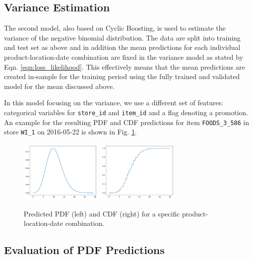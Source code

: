 \documentclass[BCOR=1mm, DIV=calc,10pt,
twoside=true,
twocolumn,
headings=normal]{scrartcl}
\newcommand{\fig}{Fig. }
\newcommand{\eqn}{Eqn. }
\begin{document}
\subsection{Variance Estimation}

The second model, also based on Cyclic Boosting, is used to estimate the variance of the negative binomial distribution. The data are split into training and test set as above and in addition the mean predictions for each individual product-location-date combination are fixed in the variance model as stated by \eqn \eqref{eqn:loss_likelihood}. This effectively means that the mean predictions are created in-sample for the training period using the fully trained and validated model for the mean discussed above.

In this model focusing on the variance, we use a different set of features: categorical variables for \texttt{store\_id} and \texttt{item\_id} and a flag denoting a promotion. An example for the resulting PDF and CDF predictions for item \texttt{FOODS\_3\_586} in store \texttt{WI\_1} on 2016-05-22 is shown in \fig \ref{fig:pdf_example}.

\begin{figure}
\begin{center}
\includegraphics[width=4cm]{../figures/pdf}
\includegraphics[width=4cm]{../figures/cdf}
\caption{\label{fig:pdf_example} Predicted PDF (left) and CDF (right) for a specific product-location-date combination.}
\end{center}
\end{figure}

\subsection{Evaluation of PDF Predictions}
\end{document}
